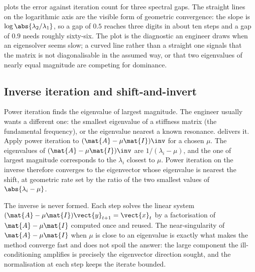 

 plots the error against
iteration count for three spectral gaps. The straight lines on the
logarithmic axis are the visible form of geometric convergence: the
slope is $\log\abs{\lambda_{2}/\lambda_{1}}$, so a gap of $0.5$ reaches
three digits in about ten steps and a gap of $0.9$ needs roughly
sixty-six. The plot is the diagnostic an engineer draws when an
eigensolver seems slow; a curved line rather than a straight one
signals that the matrix is not diagonalisable in the assumed way, or
that two eigenvalues of nearly equal magnitude are competing for
dominance.

\subsection{Inverse iteration and shift-and-invert}

Power iteration finds the eigenvalue of largest magnitude. The
engineer usually wants a different one: the smallest eigenvalue of a
stiffness matrix (the fundamental frequency), or the eigenvalue
nearest a known resonance.  delivers it.
Apply power iteration to $(\mat{A} - \mu \mat{I})\inv$ for a chosen
 $\mu$. The eigenvalues of $(\mat{A} - \mu \mat{I})
\inv$ are $1/(\lambda_{i} - \mu)$, and the one of largest magnitude
corresponds to the $\lambda_{i}$ closest to $\mu$. Power iteration on
the inverse therefore converges to the eigenvector whose eigenvalue is
nearest the shift, at geometric rate set by the ratio of the two
smallest values of $\abs{\lambda_{i} - \mu}$.

The inverse is never formed. Each step solves the linear system
$(\mat{A} - \mu \mat{I})\vect{y}_{t+1} = \vect{x}_{t}$ by a
factorisation of $\mat{A} - \mu \mat{I}$ computed once and reused. The
near-singularity of $\mat{A} - \mu \mat{I}$ when $\mu$ is close to an
eigenvalue is exactly what makes the method converge fast and does not
spoil the answer: the large component the ill-conditioning amplifies
is precisely the eigenvector direction sought, and the normalisation
at each step keeps the iterate bounded.

